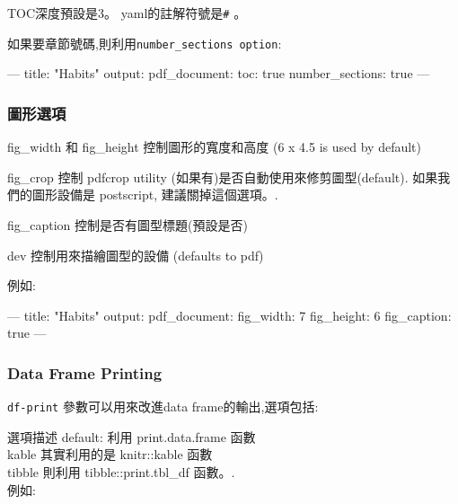 \documentclass[]{book}
\newenvironment{Shaded}{\begin{snugshade}}{\end{snugshade}}
\newcommand{\AttributeTok}[1]{\textcolor[rgb]{0.77,0.63,0.00}{#1}}
\newcommand{\FunctionTok}[1]{\textcolor[rgb]{0.00,0.00,0.00}{#1}}
\newcommand{\OtherTok}[1]{\textcolor[rgb]{0.56,0.35,0.01}{#1}}
\newcommand{\StringTok}[1]{\textcolor[rgb]{0.31,0.60,0.02}{#1}}
\theoremstyle{definition}
\theoremstyle{definition}
\theoremstyle{definition}
\theoremstyle{remark}
\begin{document}
TOC深度預設是3。 yaml的註解符號是\texttt{\#} 。

如果要章節號碼,則利用\texttt{number\_sections\ option}:

\begin{Shaded}
\begin{Highlighting}[]
\OtherTok{---}
\FunctionTok{title:}\AttributeTok{ }\StringTok{"Habits"}
\FunctionTok{output:}
  \FunctionTok{pdf_document:}
    \FunctionTok{toc:}\AttributeTok{ true}
    \FunctionTok{number_sections:}\AttributeTok{ true}
\OtherTok{---}
\end{Highlighting}
\end{Shaded}

\subsubsection{圖形選項}

fig\_width 和 fig\_height 控制圖形的寬度和高度 (6 x 4.5 is used by
default)

fig\_crop 控制 pdfcrop utility (如果有)是否自動使用來修剪圖型(default).
如果我們的圖形設備是 postscript, 建議關掉這個選項。.

fig\_caption 控制是否有圖型標題(預設是否)

dev 控制用來描繪圖型的設備 (defaults to pdf)

例如:

\begin{Shaded}
\begin{Highlighting}[]
\OtherTok{---}
\FunctionTok{title:}\AttributeTok{ }\StringTok{"Habits"}
\FunctionTok{output:}
  \FunctionTok{pdf_document:}
    \FunctionTok{fig_width:}\AttributeTok{ 7}
    \FunctionTok{fig_height:}\AttributeTok{ 6}
    \FunctionTok{fig_caption:}\AttributeTok{ true}
\OtherTok{---}
\end{Highlighting}
\end{Shaded}

\hypertarget{data-frame-printing}{%
\subsubsection{Data Frame Printing}\label{data-frame-printing}}

\texttt{df-print} 參數可以用來改進data frame的輸出,選項包括:

選項描述 default: 利用 print.data.frame 函數\\
kable 其實利用的是 knitr::kable 函數\\
tibble 則利用 tibble::print.tbl\_df 函數。.\\
例如:
\end{document}
